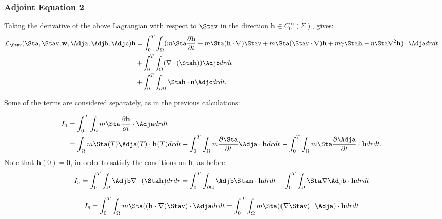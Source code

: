 \subsubsection{Adjoint Equation 2}
Taking the derivative of the above Lagrangian with respect to $\Stav$ in the direction $\mathbf{h} \in C_0^\infty(\Sigma)$, gives:
\begin{align*}
\mathcal{L}_\Stav(\Sta,\Stav,\mathbf{w},\Adja,\Adjb,\Adjc)\mathbf{h} &=  \int_0^T \int_\Omega (m \Sta \frac{\partial \mathbf{h} }{\partial t} + m \Sta (\mathbf{h} \cdot \nabla)\Stav + m \Sta (\Stav \cdot \nabla)\mathbf{h} + m \gamma \Sta \mathbf{h} - \eta \Sta \nabla^2 \mathbf{h}) \cdot \Adja dr dt\\
& + \int_0^T \int_\Omega ( \nabla \cdot (\Sta \mathbf{h})) \Adjb dr dt\\ 
& +\int_0^T \int_{\partial\Omega} \Sta \mathbf{h} \cdot \mathbf{n} \Adjc dr dt.
\end{align*}

Some of the terms are considered separately, as in the previous calculations:

\begin{align*}
I_4 &= \int_0^T \int_\Omega m \Sta \frac{\partial \mathbf{h} }{\partial t} \cdot \Adja dr dt \\
&= \int_\Omega m \Sta(T) \Adja(T) \cdot \mathbf{h}(T) dr dt - \int_0^T \int_\Omega  m\frac{\partial \Sta}{\partial t} \Adja \cdot \mathbf{h} dr dt - \int_0^T \int_\Omega m \Sta \frac{\partial \Adja}{\partial t} \cdot \mathbf{h} dr dt.
\end{align*}
Note that $\mathbf{h}(0)=\mathbf{0}$, in order to satisfy the conditions on $\mathbf{h}$, as before.
\begin{align*}
I_5= \int_0^T \int_\Omega \Adjb\nabla \cdot ( \Sta \mathbf{h}) dr dr = \int_0^T \int_{\partial \Omega} \Adjb \Sta  \mathbf{n}\cdot \mathbf{h} dr dt - \int_0^T \int_\Omega \Sta\nabla \Adjb \cdot  \mathbf{h} dr dt
\end{align*}

\begin{align*}
I_6 = \int_0^T \int_\Omega m \Sta ((\mathbf{h} \cdot \nabla)\Stav ) \cdot\Adja dr dt = \int_0^T \int_\Omega m \Sta ((\nabla \Stav)^\top\Adja) \cdot  \mathbf{h} dr dt
\end{align*}

